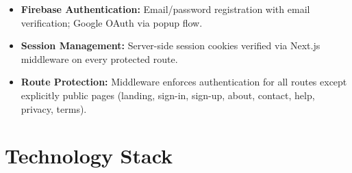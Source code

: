 \documentclass[12pt,a4paper,oneside]{report}
\begin{document}
\begin{itemize}
  \item \textbf{Firebase Authentication:} Email/password registration with email verification; Google OAuth via popup flow.
  \item \textbf{Session Management:} Server-side session cookies verified via Next.js middleware on every protected route.
  \item \textbf{Route Protection:} Middleware enforces authentication for all routes except explicitly public pages (landing, sign-in, sign-up, about, contact, help, privacy, terms).
\end{itemize}


\section{Technology Stack}
\end{document}
